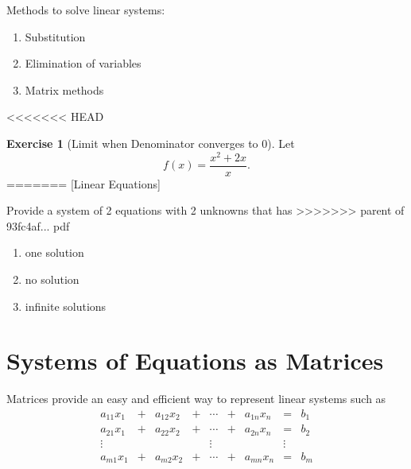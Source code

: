 \documentclass[]{book}
\providecommand{\tightlist}{%
  \setlength{\itemsep}{0pt}\setlength{\parskip}{0pt}}
\theoremstyle{definition}
\theoremstyle{definition}
\theoremstyle{definition}
\newtheorem{exercise}{Exercise}[chapter]
\theoremstyle{remark}
\begin{document}
Methods to solve linear systems:

\begin{enumerate}
\def\labelenumi{\arabic{enumi}.}
\tightlist
\item
  Substitution
\item
  Elimination of variables
\item
  Matrix methods
\end{enumerate}

<<<<<<< HEAD
\begin{exercise}[Limit when Denominator converges to 0]
\protect\hypertarget{exr:discontdraw}{}{\label{exr:discontdraw} {} }
Let \[f(x) = \frac{x^2 + 2x}{x}.\]
=======
[Linear Equations]
\protect\hypertarget{exr:lineareq}{}{\label{exr:lineareq} {} }

Provide a system of 2 equations with 2 unknowns that has
>>>>>>> parent of 93fc4af... pdf

\begin{enumerate}
\def\labelenumi{\arabic{enumi}.}
\item
  one solution
\item
  no solution
\item
  infinite solutions
\end{enumerate}
\end{exercise}

\hypertarget{systems-of-equations-as-matrices}{%
\section{Systems of Equations as Matrices}\label{systems-of-equations-as-matrices}}

Matrices provide an easy and efficient way to represent linear systems such as
\[\begin{matrix}
        a_{11}x_1  & + & a_{12}x_2 & + & \cdots & + & a_{1n}x_n & = & b_1\\
        a_{21}x_1  & + & a_{22}x_2 & + & \cdots & + & a_{2n}x_n & = & b_2\\
        \vdots     &   &     &   & \vdots &   &     & \vdots & \\
        a_{m1}x_1  & + & a_{m2}x_2 & + & \cdots & + & a_{mn}x_n & = & b_m
        \end{matrix}\]
\end{document}
